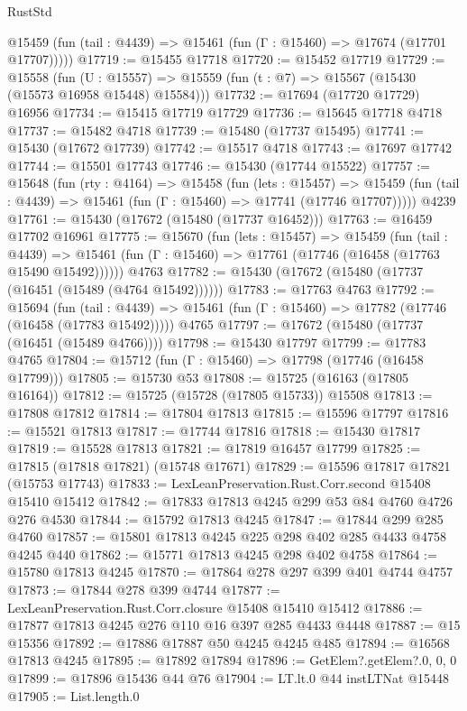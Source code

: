\begin{lexlean}{RustStd}
\begin{coremodule}
      @15459 (fun (tail : @4439) => @15461 (fun (Γ : @15460) => @17674 (@17701 @17707)))))
@17719 := @15455 @17718
@17720 := @15452 @17719
@17729 := @15558
    (fun (U : @15557) => @15559 (fun (t : @7) => @15567 (@15430 (@15573 @16958 @15448) @15584)))
@17732 := @17694 (@17720 @17729) @16956
@17734 := @15415 @17719 @17729
@17736 := @15645 @17718 @4718
@17737 := @15482 @4718
@17739 := @15480 (@17737 @15495)
@17741 := @15430 (@17672 @17739)
@17742 := @15517 @4718
@17743 := @17697 @17742
@17744 := @15501 @17743
@17746 := @15430 (@17744 @15522)
@17757 := @15648
    (fun (rty : @4164) =>
    @15458
      (fun (lets : @15457) =>
      @15459 (fun (tail : @4439) => @15461 (fun (Γ : @15460) => @17741 (@17746 @17707)))))
    @4239
@17761 := @15430 (@17672 (@15480 (@17737 @16452)))
@17763 := @16459 @17702 @16961
@17775 := @15670
    (fun (lets : @15457) =>
    @15459
      (fun (tail : @4439) =>
      @15461 (fun (Γ : @15460) => @17761 (@17746 (@16458 (@17763 @15490 @15492))))))
    @4763
@17782 := @15430 (@17672 (@15480 (@17737 (@16451 (@15489 (@4764 @15492))))))
@17783 := @17763 @4763
@17792 := @15694
    (fun (tail : @4439) => @15461 (fun (Γ : @15460) => @17782 (@17746 (@16458 (@17783 @15492)))))
    @4765
@17797 := @17672 (@15480 (@17737 (@16451 (@15489 @4766))))
@17798 := @15430 @17797
@17799 := @17783 @4765
@17804 := @15712 (fun (Γ : @15460) => @17798 (@17746 (@16458 @17799)))
@17805 := @15730 @53
@17808 := @15725 (@16163 (@17805 @16164))
@17812 := @15725 (@15728 (@17805 @15733)) @15508
@17813 := @17808 @17812
@17814 := @17804 @17813
@17815 := @15596 @17797
@17816 := @15521 @17813
@17817 := @17744 @17816
@17818 := @15430 @17817
@17819 := @15528 @17813
@17821 := @17819 @16457 @17799
@17825 := @17815 (@17818 @17821) (@15748 @17671)
@17829 := @15596 @17817 @17821 (@15753 @17743)
@17833 := LexLeanPreservation.Rust.Corr.second @15408 @15410 @15412
@17842 := @17833 @17813 @4245 @299 @53 @84 @4760 @4726 @276 @4530
@17844 := @15792 @17813 @4245
@17847 := @17844 @299 @285 @4760
@17857 := @15801 @17813 @4245 @225 @298 @402 @285 @4433 @4758 @4245 @440
@17862 := @15771 @17813 @4245 @298 @402 @4758
@17864 := @15780 @17813 @4245
@17870 := @17864 @278 @297 @399 @401 @4744 @4757
@17873 := @17844 @278 @399 @4744
@17877 := LexLeanPreservation.Rust.Corr.closure @15408 @15410 @15412
@17886 := @17877 @17813 @4245 @276 @110 @16 @397 @285 @4433 @4448
@17887 := @15 @15356
@17892 := @17886 @17887 @50 @4245 @4245 @485
@17894 := @16568 @17813 @4245
@17895 := @17892 @17894
@17896 := GetElem?.getElem?.{0, 0, 0}
@17899 := @17896 @15436 @44 @76
@17904 := LT.lt.{0} @44 instLTNat @15448
@17905 := List.length.{0}

\end{coremodule}
\end{lexlean}
